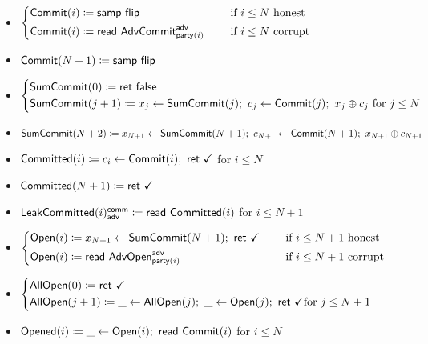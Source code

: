 \begin{itemize}
\item {\color{blue} $\begin{cases*} \Commit(i) \coloneqq \samp{\flip} & \hspace{10pt} \text{if $i \leq N$ honest} \\ \Commit(i) \coloneqq \read{\AdvCommit^\adv_{\party(i)}} & \hspace{10pt} \text{if $i \leq N$ corrupt} \end{cases*}$}
\item {\color{blue} $\mathsf{Commit}(N+1) \coloneqq \mathsf{samp} \ \mathsf{flip}$}
\item {\color{blue} $\begin{cases*} \SumCommit(0) \coloneqq \ret{\false} \\ \SumCommit(j+1) \coloneqq x_j \leftarrow \SumCommit(j); \ c_j \leftarrow \Commit(j); \ x_j \oplus c_j \text{ for $j \leq N$} \end{cases*}$}
\item {\color{blue} $\SumCommit(N+2) \coloneqq x_{N+1} \leftarrow \SumCommit(N+1); \ c_{N+1} \leftarrow \Commit(N+1); \ x_{N+1} \oplus c_{N+1}$}
\item {\color{magenta} $\mathsf{Committed}(i) \coloneqq c_i \leftarrow \mathsf{Commit}(i); \ \mathsf{ret} \ \checkmark$ for $i \leq N$}
\item {\color{magenta} $\mathsf{Committed}(N+1) \coloneqq \mathsf{ret} \ \checkmark$}
\item {\color{magenta} $\mathsf{LeakCommitted}(i)^{\mathsf{comm}}_{\mathsf{adv}} \coloneqq \mathsf{read} \ \mathsf{Committed}(i)$ for $i \leq N+1$}
\item {\color{teal} $\begin{cases*} \Open(i) \coloneqq x_{N+1}\leftarrow \SumCommit(N+1); \ \ret{\checkmark} & \hspace{10pt} \text{if $i \leq N+1$ honest} \\ \Open(i) \coloneqq \read{\AdvOpen^\adv_{\party(i)}} & \hspace{10pt} \text{if $i \leq N+1$ corrupt} \end{cases*}$}
\item {\color{teal} $\begin{cases*} \AllOpen(0) \coloneqq \ret{\checkmark} \\ \AllOpen(j+1) \coloneqq \_ \leftarrow \AllOpen(j); \ \_ \leftarrow \Open(j); \ \ret{\checkmark} \text{for $j \leq N+1$} \end{cases*}$}
\item {\color{red} $\mathsf{Opened}(i) \coloneqq \_ \leftarrow \mathsf{Open}(i); \ \mathsf{read} \ \mathsf{Commit}(i)$ for $i \leq N$}

\end{itemize}
